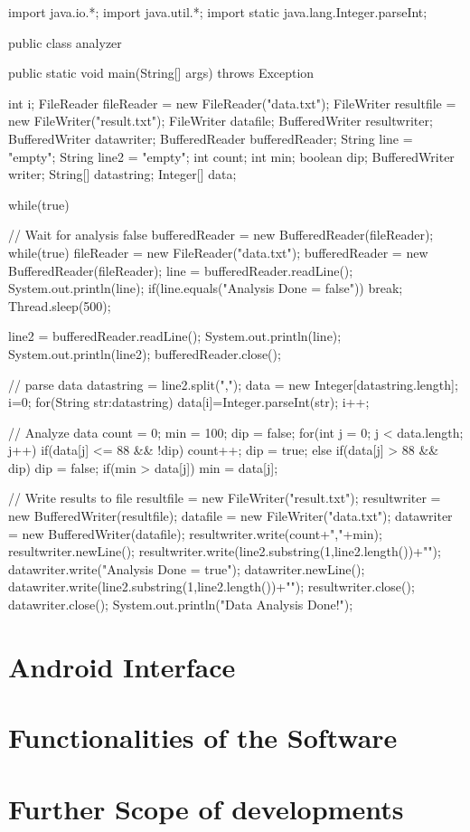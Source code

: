 \documentclass{article}
\begin{document}
\begin{java}
import java.io.*;
import java.util.*;
import static java.lang.Integer.parseInt;

public class analyzer{

	public static void main(String[] args) throws Exception {
		int i;
		FileReader fileReader = new FileReader("data.txt");
		FileWriter resultfile = new FileWriter("result.txt");
		FileWriter datafile;
		BufferedWriter resultwriter;
		BufferedWriter datawriter;
		BufferedReader bufferedReader;
		String line = "empty";
		String line2 = "empty";
		int count;
		int min;
		boolean dip;
		BufferedWriter writer;
		String[] datastring;
		Integer[] data;

		while(true){

			// Wait for analysis false
			bufferedReader = new BufferedReader(fileReader);
			while(true){
				fileReader = new FileReader("data.txt");
				bufferedReader = new BufferedReader(fileReader);
				line = bufferedReader.readLine();
				System.out.println(line);
				if(line.equals("Analysis Done = false")){
					break;
				}
				Thread.sleep(500);
			}

			line2 = bufferedReader.readLine();
			System.out.println(line);
			System.out.println(line2);
			bufferedReader.close();
	
			// parse data
			datastring = line2.split(",");
			data = new Integer[datastring.length];
			i=0;
    		for(String str:datastring){
        		data[i]=Integer.parseInt(str);
        		i++;
    		}

    		// Analyze data
    		count = 0;
    		min = 100;
    		dip = false;
    		for(int j = 0; j < data.length; j++){
    			if(data[j] <= 88 && !dip){
    				count++;
    				dip = true;
    			}
    			else if(data[j] > 88 && dip){
    				dip = false;
    			}
    			if(min > data[j]){
    				min = data[j];
    			}
    		}

    	// Write results to file
		resultfile = new FileWriter("result.txt");
		resultwriter = new BufferedWriter(resultfile);
		datafile = new FileWriter("data.txt");
		datawriter = new BufferedWriter(datafile);
		resultwriter.write(count+","+min);
		resultwriter.newLine();
        	resultwriter.write(line2.substring(1,line2.length())+"\n");
        	datawriter.write("Analysis Done = true");
		datawriter.newLine();    		
		datawriter.write(line2.substring(1,line2.length())+"\n");
		resultwriter.close();
		datawriter.close();
		System.out.println("Data Analysis Done!");
		}
	}
}
\end{java}

\section{Android Interface}

\section{Functionalities of the Software}

\section{Further Scope of developments}
\end{document}
